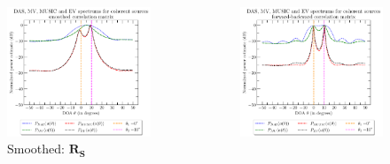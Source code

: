 \documentclass[UKenglish,8pt,aspectratio=1610]{beamer}
\begin{document}
\begin{frame}
\begin{columns}
	\begin{column}{0.33\textwidth}
	\begin{figure}[h!]
		\centering
		\includegraphics[scale=0.27]{question8/spectrums/part_A_question_8_all_spectrums_smoothed_correlation_matrix}
	\caption{Smoothed: $\mathbf{R_S}$}
	\end{figure}
\end{column}
	\begin{column}{0.33\textwidth}
	\begin{figure}[h!]
		\centering
		\includegraphics[scale=0.27]{question8/spectrums/part_A_question_8_all_spectrums_forward_backward_correlation_matrix}

\end{figure}
\end{column}
\end{columns}
\end{frame}
\end{document}
